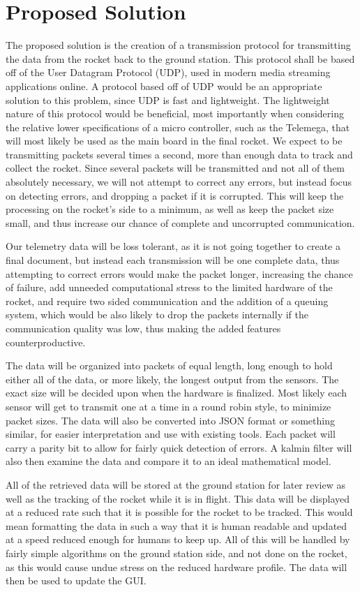 \documentclass[onecolumn, draftclsnofoot,10pt, compsoc]{IEEEtran}
\begin{document}
\section{Proposed Solution}
The proposed solution is the creation of a transmission protocol for transmitting the data from the rocket back to the ground station. This protocol shall be based off of the User Datagram Protocol (UDP), used in modern media streaming applications online. A protocol based off of UDP would be an appropriate solution to this problem, since UDP is fast and lightweight. The lightweight nature of this protocol would be beneficial, most importantly when considering the relative lower specifications of a micro controller, such as the Telemega, that will most likely be used as the main board in the final rocket. We expect to be transmitting packets several times a second, more than enough data to track and collect the rocket. Since several packets will be transmitted and not all of them absolutely necessary, we will not attempt to correct any errors, but instead focus on detecting errors, and dropping a packet if it is corrupted. This will keep the processing on the rocket’s side to a minimum, as well as keep the packet size small, and thus increase our chance of complete and uncorrupted communication.  \par
Our telemetry data will be loss tolerant, as it is not going together to create a final document, but instead each transmission will be one complete data, thus attempting to correct errors would make the packet longer, increasing the chance of failure, add unneeded computational stress to the limited hardware of the rocket, and require two sided communication and the addition of a queuing system, which would be also likely to drop the packets internally if the communication quality was low, thus making the added features counterproductive. \par
The data will be organized into packets of equal length, long enough to hold either all of the data, or more likely, the longest output from the sensors. The exact size will be decided upon when the hardware is finalized. Most likely each sensor will get to transmit one at a time in a round robin style, to minimize packet sizes. The data will also be converted into JSON format or something similar, for easier interpretation and use with existing tools. Each packet will carry a parity bit to allow for fairly quick detection of errors. A kalmin filter will also then examine the data and compare it to an ideal mathematical model. \par 
All of the retrieved data will be stored at the ground station for later review as well as the tracking of the rocket while it is in flight. This data will be displayed at a reduced rate such that it is possible for the rocket to be tracked. This would mean formatting the data in such a way that it is human readable and updated at a speed reduced enough for humans to keep up. All of this will be handled by fairly simple algorithms on the ground station side, and not done on the rocket, as this would cause undue stress on the reduced hardware profile. The data will then be used to update the GUI. \par
\end{document}
